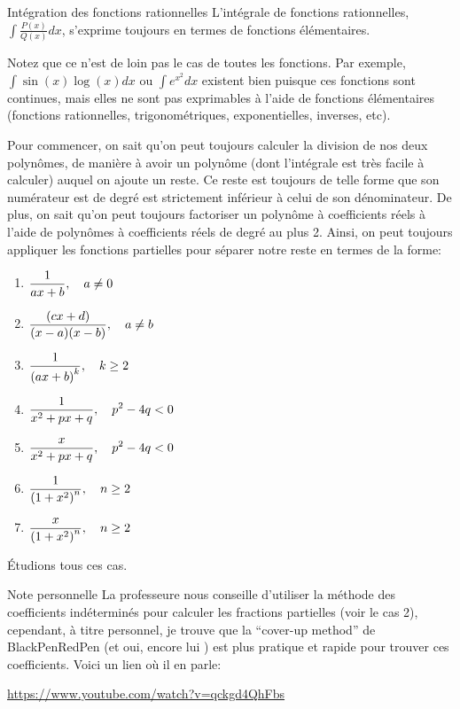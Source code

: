 \documentclass[a4paper]{article}
\begin{document}
\begin{parag}{Intégration des fonctions rationnelles}
    L'intégrale de fonctions rationnelles, $\int \frac{P\left(x\right)}{Q\left(x\right)}dx$, s'exprime toujours en termes de fonctions élémentaires.

    Notez que ce n'est de loin pas le cas de toutes les fonctions. Par exemple, $\int \sin\left(x\right) \log\left(x\right) dx$ ou $\int e^{x^2} dx$ existent bien puisque ces fonctions sont continues, mais elles ne sont pas exprimables à l'aide de fonctions élémentaires (fonctions rationnelles, trigonométriques, exponentielles, inverses, etc).

    Pour commencer, on sait qu'on peut toujours calculer la division de nos deux polynômes, de manière à avoir un polynôme (dont l'intégrale est très facile à calculer) auquel on ajoute un reste. Ce reste est toujours de telle forme que son numérateur est de degré est strictement inférieur à celui de son dénominateur. De plus, on sait qu'on peut toujours factoriser un polynôme à coefficients réels à l'aide de polynômes à coefficients réels de degré au plus 2. Ainsi, on peut toujours appliquer les fonctions partielles pour séparer notre reste en termes de la forme:
    \begin{enumerate}
        \item $\displaystyle \frac{1}{ax + b}, \quad a \neq 0$
        \item $\displaystyle \frac{\left(cx + d\right)}{\left(x - a\right)\left(x - b\right)}, \mathspace a \neq b$ 
        \item $\displaystyle \frac{1}{\left(ax + b\right)^k}, \mathspace k \geq 2$
        \item $\displaystyle \frac{1}{x^2 + px + q}, \quad p^2 - 4q < 0$
        \item $\displaystyle \frac{x}{x^2 + px + q}, \quad p^2 - 4q < 0$
        \item $\displaystyle \frac{1}{\left(1 +  x^2\right)^n}, \mathspace n \geq 2$
        \item $\displaystyle \frac{x}{\left(1 + x^2\right)^n}, \mathspace n \geq 2$
    \end{enumerate}


    
    Étudions tous ces cas.

    \begin{subparag}{Note personnelle}
        La professeure nous conseille d'utiliser la méthode des coefficients indéterminés pour calculer les fractions partielles (voir le cas 2), cependant, à titre personnel, je trouve que la ``cover-up method'' de BlackPenRedPen (et oui, encore lui \smiley) est plus pratique et rapide pour trouver ces coefficients. Voici un lien où il en parle:
        \begin{center}
            \url{https://www.youtube.com/watch?v=qckgd4QhFbs}
        \end{center}
    \end{subparag}
    


\end{parag}
\end{document}
